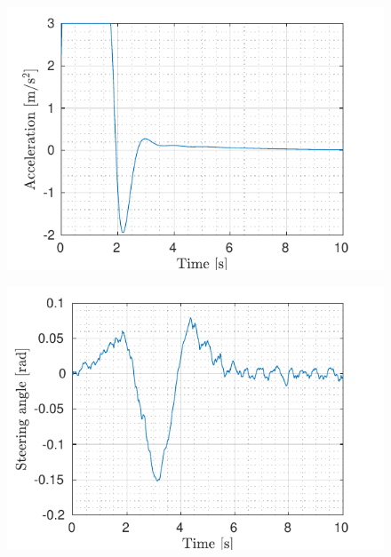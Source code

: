 \begin{figure}[!h]
\begin{minipage}[t]{0.5\textwidth}
		\includegraphics[width=\textwidth]{../../MATLAB/lane_following_curve/figure/AccelerationVsTime_curve.pdf}
		\label{fig:acceleration_laneFollowing_curve}
	\end{minipage}
	\begin{minipage}[t]{0.5\textwidth}
		\includegraphics[width=\textwidth]{../../MATLAB/lane_following_curve/figure/SteeringAngleVsTime_curve.pdf}
		\label{fig:steering_laneFollowing_curve}
	\end{minipage}
	\begin{minipage}[t]{0.5\textwidth}

\end{minipage}
\end{figure}
